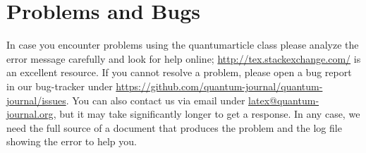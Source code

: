\documentclass[a4paper,twocolumn,11pt,accepted=2017-05-09]{quantumarticle}
\begin{document}
\section{Problems and Bugs}
In case you encounter problems using the quantumarticle class please analyze the error message carefully and look for help online; \href{http://tex.stackexchange.com/}{http://tex.stackexchange.com/} is an excellent resource.
If you cannot resolve a problem, please open a bug report in our bug-tracker under \href{https://github.com/quantum-journal/quantum-journal/issues}{https://github.com/quantum-journal/quantum-journal/issues}.
You can also contact us via email under \href{mailto:latex@quantum-journal.org}{latex@quantum-journal.org}, but it may take significantly longer to get a response.
In any case, we need the full source of a document that produces the problem and the log file showing the error to help you.
\end{document}

